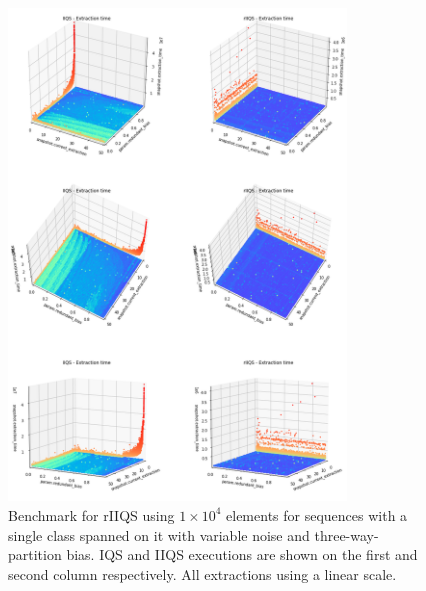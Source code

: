 \begin{figure}[!ht]
    \centering
    \includegraphics[width=0.8\textwidth]{./fragments/05_workhorse_experiment/images/01_basebenchmark_06_redundant_bias.png}
    \caption{Benchmark for rIIQS using $1\times10^4$ elements for sequences with a single class spanned on it with variable noise and three-way-partition bias. IQS and IIQS executions are shown on the first and second column respectively. All extractions using a linear scale.}
    \label{FIG:WORKHORSE_BENCHMARK_06}
\end{figure}

